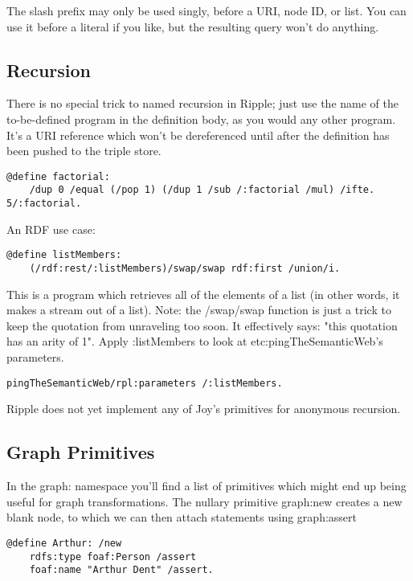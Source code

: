 \documentclass[runningheads]{llncs}
\begin{document}
The slash prefix may only be used singly, before a URI, node ID, or list.  You can use it before a literal if you like, but the resulting query won't do anything.



\subsection{Recursion}

There is no special trick to named recursion in Ripple; just use the name of the to-be-defined program in the definition body, as you would any other program.  It's a URI reference which won't be dereferenced until after the definition has been pushed to the triple store.

\begin{verbatim}
@define factorial:
    /dup 0 /equal (/pop 1) (/dup 1 /sub /:factorial /mul) /ifte.
5/:factorial.
\end{verbatim}

An RDF use case:

\begin{verbatim}
@define listMembers:
    (/rdf:rest/:listMembers)/swap/swap rdf:first /union/i.
\end{verbatim}

This is a program which retrieves all of the elements of a list (in other words, it makes a stream out of a list).  Note: the /swap/swap function is just a trick to keep the quotation from unraveling too soon.  It effectively says: "this quotation has an arity of 1".  Apply :listMembers to look at etc:pingTheSemanticWeb's parameters.

\begin{verbatim}
pingTheSemanticWeb/rpl:parameters /:listMembers.
\end{verbatim}

Ripple does not yet implement any of Joy's primitives for anonymous recursion.

\subsection{Graph Primitives}

In the graph: namespace you'll find a list of primitives which might end up being useful for graph transformations.  The nullary primitive graph:new creates a new blank node, to which we can then attach statements using graph:assert

\begin{verbatim}
@define Arthur: /new
    rdfs:type foaf:Person /assert
    foaf:name "Arthur Dent" /assert.
\end{verbatim}
\end{document}
